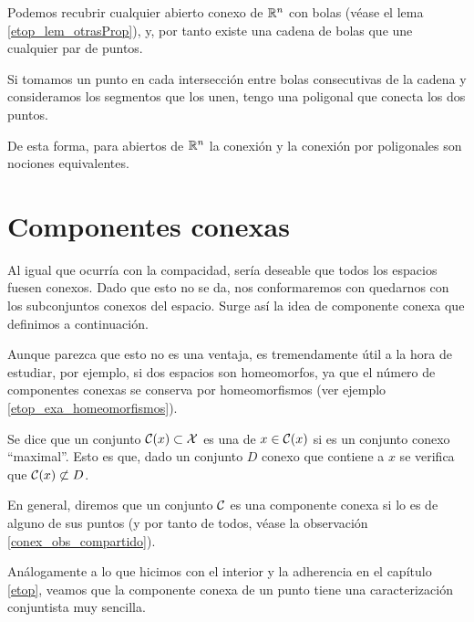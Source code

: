 \begin{obs}
	\label{conex_obs_polig}
	Podemos recubrir cualquier abierto conexo de $\mathbb{R}^n$ con bolas (véase el lema \ref{etop_lem_otrasProp}), y, por tanto existe una cadena de bolas que une cualquier par de puntos.
	
	Si tomamos un punto en cada intersección entre bolas consecutivas de la cadena y consideramos los segmentos que los unen, tengo una poligonal que conecta los dos puntos.
	
	De esta forma, para abiertos de $\mathbb{R}^n$ la conexión y la conexión por poligonales son nociones equivalentes.
\end{obs}

\section{Componentes conexas}

Al igual que ocurría con la compacidad, sería deseable que todos los espacios fuesen conexos. Dado que esto no se da, nos conformaremos con quedarnos con los subconjuntos conexos del espacio. Surge así la idea de componente conexa que definimos a continuación.

Aunque parezca que esto no es una ventaja, es tremendamente útil a la hora de estudiar, por ejemplo, si dos espacios son homeomorfos, ya que el número de componentes conexas se conserva por homeomorfismos (ver ejemplo \ref{etop_exa_homeomorfismos}).

\begin{defi}
	Se dice que un conjunto $\mathcal{C}(x)\subset\mathcal{X}$ es una  de $x\in\mathcal{C}(x)$ si es un conjunto conexo ``maximal''. Esto es que, dado un conjunto $D$ conexo que contiene a $x$ se verifica que $\mathcal{C}(x)\not\subset D$.
	
	En general, diremos que un conjunto $\mathcal{C}$ es una componente conexa si lo es de alguno de sus puntos (y por tanto de todos, véase la observación \ref{conex_obs_compartido}).
\end{defi}

Análogamente a lo que hicimos con el interior y la adherencia en el capítulo \ref{etop}, veamos que la componente conexa de un punto tiene una caracterización conjuntista muy sencilla.

